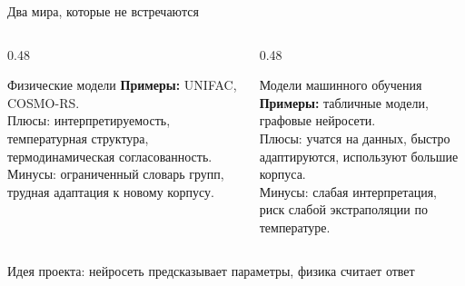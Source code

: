 \documentclass[aspectratio=169,10pt]{beamer}
\begin{document}
\begin{frame}{Два мира, которые не встречаются}
  \small
  \begin{columns}[T,onlytextwidth]
    \begin{column}{0.48\textwidth}
      \begin{block}{Физические модели}
        \scriptsize
        \textbf{Примеры:} UNIFAC, COSMO-RS.\\[0.25em]
        \textcolor{TGGreen}{Плюсы:} интерпретируемость, температурная структура, термодинамическая согласованность.\\
        \textcolor{TGRed}{Минусы:} ограниченный словарь групп, трудная адаптация к новому корпусу.
      \end{block}
    \end{column}
    \begin{column}{0.48\textwidth}
      \begin{block}{Модели машинного обучения}
        \scriptsize
        \textbf{Примеры:} табличные модели, графовые нейросети.\\[0.25em]
        \textcolor{TGGreen}{Плюсы:} учатся на данных, быстро адаптируются, используют большие корпуса.\\
        \textcolor{TGRed}{Минусы:} слабая интерпретация, риск слабой экстраполяции по температуре.
      \end{block}
    \end{column}
  \end{columns}
  \vspace{0.5em}
  \begin{center}
    \Large\textcolor{TGOrange}{Идея проекта: нейросеть предсказывает параметры, физика считает ответ}
  \end{center}
\end{frame}
\end{document}
